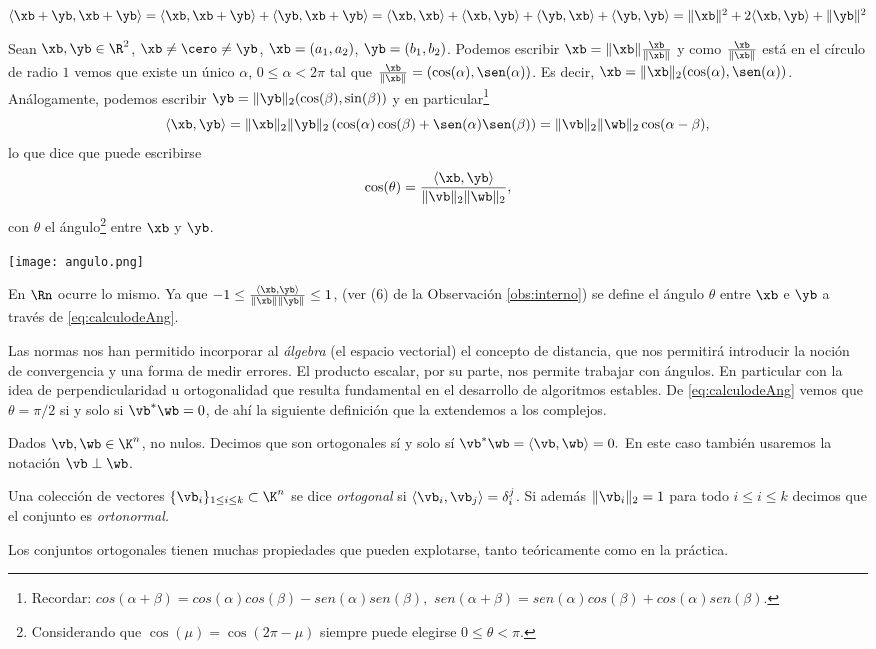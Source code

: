 \begin{ejemplo}
$\langle \xb + \yb, \xb + \yb\rangle = \langle \xb, \xb + \yb\rangle + \langle \yb, \xb + \yb\rangle = \langle \xb, \xb \rangle + \langle \xb, \yb \rangle + \langle \yb, \xb \rangle + \langle \yb, \yb\rangle = \|\xb\|^2 + 2\langle \xb, \yb \rangle + \|\yb\|^2$
\end{ejemplo}
Sean $\xb,\yb\in \R^2$, $\xb\neq \cero\neq \yb$, $\xb=(a_1,a_2)$, $\yb=(b_1,b_2)$.   Podemos escribir $\xb=\|\xb\|\frac{\xb}{\|\xb\|}$ y como $ \frac{\xb}{\|\xb\|}$ está en el círculo de radio $1$ vemos que existe un único $\alpha$, $0\le \alpha<2\pi$ tal que
$ \frac{\xb}{\|\xb\|}=(\cos(\alpha),\sen(\alpha))$. Es decir, $\xb=\|\xb\|_2(\cos(\alpha),\sen(\alpha))$. Análogamente, podemos escribir $\yb=\|\yb\|_2(\cos(\beta),\sin(\beta))$ y en particular\footnote{Recordar: $
cos(\alpha +\beta)=cos(\alpha)cos(\beta)-sen(\alpha)sen(\beta),
$
$
sen(\alpha +\beta)=sen(\alpha)cos(\beta)+cos(\alpha)sen(\beta).
$
}
$$
\langle \xb,\yb\rangle= \|\xb\|_2\|\yb\|_2\left(\cos(\alpha)\cos(\beta)+\sen(\alpha)\sen(\beta)\right)=\|\vb\|_2\|\wb\|_2\cos(\alpha-\beta),
$$
lo que dice que puede escribirse
\begin{equation}
 \label{eq:calculodeAng}
\cos(\theta)=\frac{\langle \xb,\yb\rangle}{\|\vb\|_2\|\wb\|_2},
\end{equation}
con $\theta$ el ángulo\footnote{Considerando que $\cos(\mu)=\cos(2\pi-\mu)$ siempre puede elegirse $0\le \theta < \pi$.} entre $\xb$ y $\yb$.
\begin{center}
 \texttt{[image: angulo.png]}
\end{center}
En $\Rn$ ocurre lo mismo. Ya que $-1\le\frac{\langle \xb, \yb\rangle}{\|\xb\|\|\yb\|}\le 1$, (ver (6) de la Observación \ref{obs:interno}) se define el ángulo $\theta$ entre $\xb$ e $\yb$ a través de \eqref{eq:calculodeAng}.



\tcc
Las normas nos han permitido incorporar al \emph{álgebra} (el espacio vectorial) el concepto de distancia, que  nos permitirá introducir la noción de convergencia y una forma de medir errores.  El producto escalar, por su parte, nos permite trabajar con ángulos. En particular con la idea de perpendicularidad u ortogonalidad que resulta  fundamental en el desarrollo de algoritmos estables.
\etcc
De \eqref{eq:calculodeAng} vemos que $\theta=\pi/2$ si y solo si $\vb^*\wb=0$, de ahí la siguiente definición que la extendemos a los complejos.
\tccdefi
\begin{defi}
 Dados $\vb,\wb\in\K^n$, no nulos. Decimos que son ortogonales sí y solo sí  $\vb^*\wb=\langle \vb,\wb\rangle=0.$ En este caso también usaremos la notación $\vb\perp \wb$.
\end{defi}
\etcc
\tccdefi
\begin{defi}
 Una colección de vectores  $\{\vb_i\}_{1\le i\le k}\subset \K^{n}$ se dice \emph{ortogonal} si $\langle \vb_i,\vb_j\rangle =\delta_i^j$. Si además $\|\vb_i\|_2=1$ para todo $i\le i\le k$ decimos que el conjunto es \emph{ortonormal.}
\end{defi}
\etcc
Los conjuntos ortogonales tienen muchas propiedades que pueden explotarse, tanto teóricamente como en la práctica.


